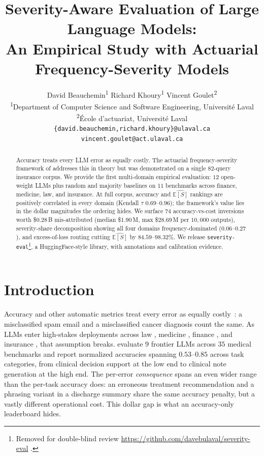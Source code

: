 \documentclass[11pt]{article}
\title{Severity-Aware Evaluation of Large Language Models:\\
An Empirical Study with Actuarial Frequency-Severity Models}
\author{
  David Beauchemin\textsuperscript{1} \quad
  Richard Khoury\textsuperscript{1} \quad
  Vincent Goulet\textsuperscript{2} \\
  \textsuperscript{1}Department of Computer Science and Software Engineering, Universit\'{e} Laval \\
  \textsuperscript{2}\'{E}cole d'actuariat, Universit\'{e} Laval \\
  \texttt{\{david.beauchemin,richard.khoury\}@ulaval.ca} \\
  \texttt{vincent.goulet@act.ulaval.ca}
}
\makeatletter
\newcommand{\ES}{\mathbb{E}[S]}
\newcommand{\seveval}{\texttt{severity-eval}}
\newcommand{\coderepo}{%
  \ifacl@anonymize
    Removed for double-blind review%
  \else
    \url{https://github.com/davebulaval/severity-eval}%
  \fi
}
\makeatother
\begin{document}
\maketitle


\begin{abstract}
Accuracy treats every LLM error as equally costly. The actuarial
frequency-severity framework of \citet{beauchemin2026position}
addresses this in theory but was demonstrated on a single
$82$-query insurance corpus. We provide the first multi-domain
empirical evaluation: $12$ open-weight LLMs plus random and
majority baselines on $11$ benchmarks across finance, medicine,
law, and insurance. At full corpus, accuracy and $\widehat{\ES}$
rankings are positively correlated in every domain (Kendall
$\tau$ $0.69$--$0.96$); the framework's value lies in the dollar
magnitudes the ordering hides. We surface $74$ accuracy-vs-cost
inversions worth \$0.28\,B mis-attributed (median \$1.90\,M,
max \$28.69\,M per $10{,}000$ outputs), severity-share
decomposition showing all four domains frequency-dominated
($0.06$--$0.27$), and excess-of-loss routing cutting
$\widehat{\ES}$ by $84.59$--$98.32\%$. We release
\seveval{}\footnote{\coderepo.}, a HuggingFace-style library,
with annotations and calibration evidence.
\end{abstract}


\section{Introduction}
\label{sec:introduction}

Accuracy and other automatic metrics treat every error as
equally costly~\citep{elkan2001foundations}: a misclassified
spam email and a misclassified cancer diagnosis count the same.
As LLMs enter high-stakes deployments across law
\citep{guha2023legalbench}, medicine \citep{bedi2025medhelm},
finance \citep{islam2023financebench}, and insurance
\citep{beauchemin2024quebec}, that assumption breaks. \citet{bedi2025medhelm}
evaluate $9$ frontier LLMs across $35$ medical benchmarks and
report normalized accuracies spanning $0.53$--$0.85$ across task
categories, from clinical decision support at the low end to
clinical note generation at the high end. The per-error
\emph{consequence} spans an even wider range than the per-task
accuracy does: an erroneous treatment recommendation and a phrasing variant in a discharge summary share the same accuracy
penalty, but a vastly different operational cost.
This dollar gap is what an accuracy-only leaderboard hides.
\end{document}
